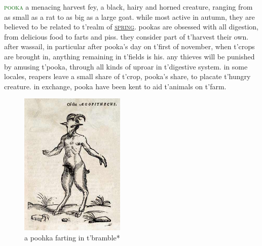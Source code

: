 \documentclass[twoside,11pt,b5paper,twocolumn]{scrbook}
\newcommand{\estcab}[1]{\textsc{\textcolor{marron}{#1}}}
\newcommand{\keyword}[1]{\textcolor{darkgreen}{#1}}
\renewcommand{\paragraph}[1]{\par\noindent\markboth{#1}{#1}\estcab{\keyword{#1}}\label{#1} }
\newcommand{\see}[1]{{\estcab{\hyperref[#1]{#1}}}}
\begin{document}
\paragraph{pooka} a menacing harvest fey, a black, hairy and horned creature, ranging from as small as a rat to as big as a large goat. while most active in autumn, they are believed to be related to t'realm of \see{spring}. pookas are obsessed with all digestion, from delicious food to farts and piss. they consider part of t'harvest their own. after wassail, in particular after pooka's day on t'first of november, when t'crops are brought in, anything remaining in t'fields is his. any thieves will be punished by amusing t'pooka, through all kinds of uproar in t'digestive system. in some locales, reapers leave a small share of t'crop, pooka's share, to placate t'hungry creature. in exchange, pooka have been kent to aid t'animals on t'farm. \begin{figure}\centering\includegraphics[width=5cm]{encyclopedia/Faun}\caption{a poohka farting in t'bramble*}\end{figure}
\end{document}
